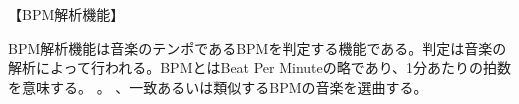 【BPM解析機能】
\par
BPM解析機能は音楽のテンポであるBPMを判定する機能である。判定は音楽の解析によって行われる。BPMとはBeat Per Minuteの略であり、1分あたりの拍数を意味する。
。
、一致あるいは類似するBPMの音楽を選曲する。
